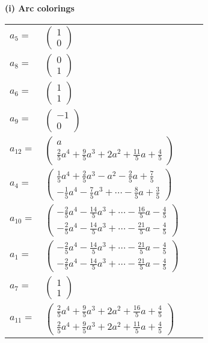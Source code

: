 \documentclass[1p]{elsarticle_modified}
\theoremstyle{definition}
\begin{document}
\flushleft \textbf{(i) Arc colorings}\\
\begin{tabular}{m{7pt} m{180pt} m{7pt} m{180pt} }
\flushright $a_{5}=$&$\begin{pmatrix}1\\0\end{pmatrix}$ \\
\flushright $a_{8}=$&$\begin{pmatrix}0\\1\end{pmatrix}$ \\
\flushright $a_{6}=$&$\begin{pmatrix}1\\1\end{pmatrix}$ \\
\flushright $a_{9}=$&$\begin{pmatrix}-1\\0\end{pmatrix}$ \\
\flushright $a_{12}=$&$\begin{pmatrix}a\\\frac{2}{5} a^4+\frac{9}{5} a^3+2 a^2+\frac{11}{5} a+\frac{4}{5}\end{pmatrix}$ \\
\flushright $a_{4}=$&$\begin{pmatrix}\frac{1}{5} a^4+\frac{2}{5} a^3- a^2-\frac{2}{5} a+\frac{7}{5}\\-\frac{1}{5} a^4-\frac{7}{5} a^3+\cdots-\frac{8}{5} a+\frac{3}{5}\end{pmatrix}$ \\
\flushright $a_{10}=$&$\begin{pmatrix}-\frac{2}{5} a^4-\frac{14}{5} a^3+\cdots-\frac{16}{5} a-\frac{4}{5}\\-\frac{2}{5} a^4-\frac{14}{5} a^3+\cdots-\frac{21}{5} a-\frac{4}{5}\end{pmatrix}$ \\
\flushright $a_{1}=$&$\begin{pmatrix}-\frac{2}{5} a^4-\frac{14}{5} a^3+\cdots-\frac{21}{5} a-\frac{4}{5}\\-\frac{2}{5} a^4-\frac{14}{5} a^3+\cdots-\frac{21}{5} a-\frac{4}{5}\end{pmatrix}$ \\
\flushright $a_{7}=$&$\begin{pmatrix}1\\1\end{pmatrix}$ \\
\flushright $a_{11}=$&$\begin{pmatrix}\frac{2}{5} a^4+\frac{9}{5} a^3+2 a^2+\frac{16}{5} a+\frac{4}{5}\\\frac{2}{5} a^4+\frac{9}{5} a^3+2 a^2+\frac{11}{5} a+\frac{4}{5}\end{pmatrix}$ \\

\end{tabular}
\end{document}
